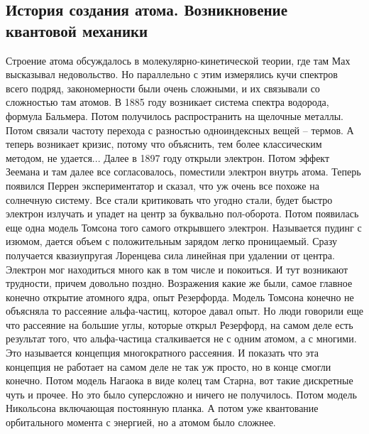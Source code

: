 \documentclass[a4paper, 12pt]{article}
\begin{document}
\subsection{История создания атома. Возникновение квантовой механики}

Строение атома обсуждалось в молекулярно-кинетической теории, где там 
Мах высказывал недовольство. Но параллельно с этим измерялись кучи 
спектров всего подряд, закономерности были очень сложными, и их 
связывали со сложностью там атомов. В 1885 году возникает система 
спектра водорода, формула Бальмера. Потом получилось распространить на 
щелочные металлы. Потом связали частоту перехода с разностью 
одноиндексных вещей -- термов. А теперь возникает кризис, потому что 
объяснить, тем более классическим методом, не удается... Далее в 1897 
году открыли электрон. Потом эффект Зеемана и там далее все 
согласовалось, поместили электрон внутрь атома. Теперь появился Перрен 
экспериментатор и сказал, что уж очень все похоже на солнечную систему. 
Все стали критиковать что угодно стали, будет быстро электрон излучать 
и упадет на центр за буквально пол-оборота. Потом появилась еще одна 
модель Томсона того самого открывшего электрон. Называется пудинг 
с изюмом, дается объем с положительным зарядом легко проницаемый. Сразу 
получается квазиупругая Лоренцева сила линейная при удалении от центра. 
Электрон мог находиться много как в том числе и покоиться. И тут 
возникают трудности, причем довольно поздно. Возражения какие же были, 
самое главное конечно открытие атомного ядра, опыт Резерфорда. Модель 
Томсона конечно не объясняла то рассеяние альфа-частиц, которое давал 
опыт. Но люди говорили еще что рассеяние на большие углы, которые открыл 
Резерфорд, на самом деле есть результат того, что альфа-частица 
сталкивается не с одним атомом, а с многими. Это называется концепция 
многократного рассеяния. И показать что эта концепция не работает на 
самом деле не так уж просто, но в конце смогли конечно. Потом модель 
Нагаока в виде колец там Старна, вот такие дискретные чуть и прочее. Но 
это было суперсложно и ничего не получилось. Потом модель Никольсона 
включающая постоянную планка. А потом уже квантование орбитального 
момента с энергией, но а атомом было сложнее.
\end{document}
